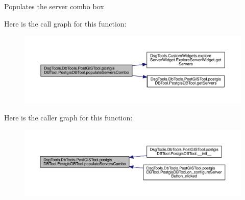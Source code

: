 \begin{DoxyVerb}Populates the server combo box
\end{DoxyVerb}
 Here is the call graph for this function\+:
\nopagebreak
\begin{figure}[H]
\begin{center}
\leavevmode
\includegraphics[width=350pt]{class_dsg_tools_1_1_db_tools_1_1_post_g_i_s_tool_1_1postgis_d_b_tool_1_1_postgis_d_b_tool_aebb08bed4f8c5d2154bc4161fde9ac54_cgraph}
\end{center}
\end{figure}
Here is the caller graph for this function\+:
\nopagebreak
\begin{figure}[H]
\begin{center}
\leavevmode
\includegraphics[width=350pt]{class_dsg_tools_1_1_db_tools_1_1_post_g_i_s_tool_1_1postgis_d_b_tool_1_1_postgis_d_b_tool_aebb08bed4f8c5d2154bc4161fde9ac54_icgraph}
\end{center}
\end{figure}
\mbox{\label{class_dsg_tools_1_1_db_tools_1_1_post_g_i_s_tool_1_1postgis_d_b_tool_1_1_postgis_d_b_tool_a20384954a18f0c1c987c01c7a1ba4db1}} 
